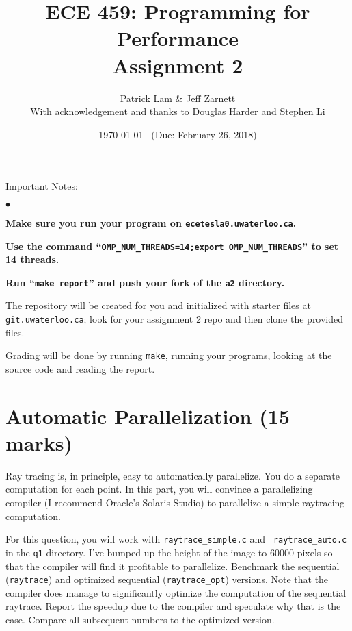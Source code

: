 \documentclass[letterpaper,10pt]{article}
\title{\bf ECE 459: Programming for Performance\\Assignment 2}
\author{Patrick Lam \& Jeff Zarnett\\
\small{With acknowledgement and thanks to Douglas Harder and Stephen Li}}
\date{\today ~ (Due: February 26, 2018)}
\begin{document}
\maketitle
\newcommand{\squishlist}{
 \begin{list}{$\bullet$}
  { \setlength{\itemsep}{0pt}
     \setlength{\parsep}{3pt}
     \setlength{\topsep}{3pt}
     \setlength{\partopsep}{0pt}
     \setlength{\leftmargin}{1.5em}
     \setlength{\labelwidth}{1em}
     \setlength{\labelsep}{0.5em} } }
\newcommand{\squishend}{
  \end{list}  }

\noindent
Important Notes:

\squishlist
  \item {\bf Make sure you run your program on {\tt ecetesla0.uwaterloo.ca}.}
  \item {\bf Use the command ``{\tt OMP\_NUM\_THREADS=14;export OMP\_NUM\_THREADS}'' to set 14 threads.}
  \item {\bf Run ``{\tt make report}'' and push your fork of the {\tt a2} directory.}
\squishend

\noindent
The repository will be created for you and initialized with starter files 
at \texttt{git.uwaterloo.ca}; look for your 
assignment 2 repo and then clone the provided files.

Grading will be done by running {\tt make}, running your programs,
looking at the source code and reading the report.

\section{Automatic Parallelization (15 marks)}
Ray tracing is, in principle, easy to automatically parallelize. You do
a separate computation for each point. In this part, you will convince a
parallelizing compiler (I recommend Oracle's Solaris Studio) to parallelize
a simple raytracing computation.

For this question, you will work with {\tt raytrace\_simple.c} and {\tt
  raytrace\_auto.c} in the {\tt q1} directory.  I've bumped up the
height of the image to 60000 pixels so that the compiler will find it
profitable to parallelize. Benchmark the sequential ({\tt raytrace})
and optimized sequential ({\tt raytrace\_opt}) versions. Note that the
compiler does manage to significantly optimize the computation of the sequential
raytrace. Report the speedup due to the compiler and
speculate why that is the case. Compare all subsequent numbers
to the optimized version.
\end{document}
